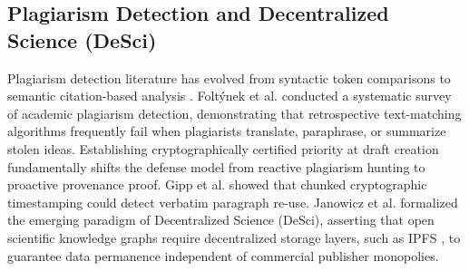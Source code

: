 \documentclass[conference]{IEEEtran}
\begin{document}
\subsection{Plagiarism Detection and Decentralized Science (DeSci)}
Plagiarism detection literature has evolved from syntactic token comparisons \cite{maurer2006plagiarism} to semantic citation-based analysis \cite{foltynek2019plagiarism}. Folt\'{y}nek et al. \cite{foltynek2019plagiarism} conducted a systematic survey of academic plagiarism detection, demonstrating that retrospective text-matching algorithms frequently fail when plagiarists translate, paraphrase, or summarize stolen ideas. Establishing cryptographically certified priority at draft creation fundamentally shifts the defense model from reactive plagiarism hunting to proactive provenance proof. Gipp et al. \cite{gipp2017antiplagiarism} showed that chunked cryptographic timestamping could detect verbatim paragraph re-use. Janowicz et al. \cite{janowicz2022desci} formalized the emerging paradigm of Decentralized Science (DeSci), asserting that open scientific knowledge graphs require decentralized storage layers, such as IPFS \cite{benet2014ipfs}, to guarantee data permanence independent of commercial publisher monopolies.
\end{document}
